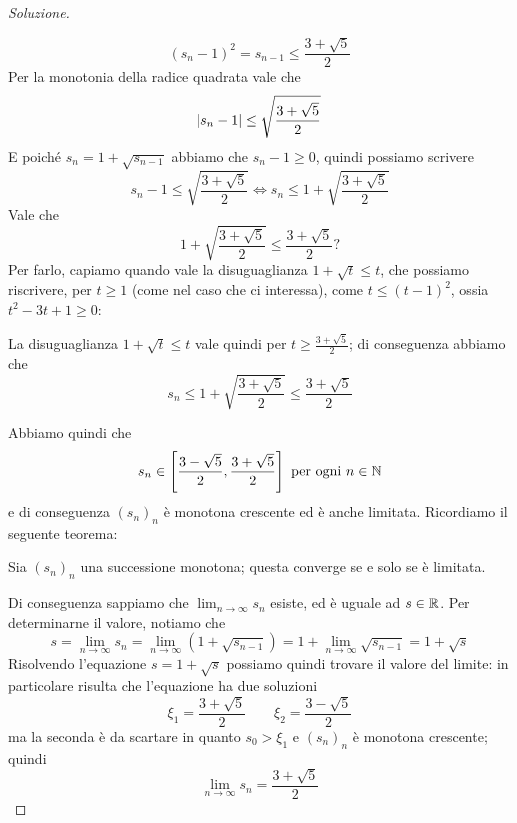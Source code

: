 \begin{proof}[Soluzione]
\begin{enumerate}[(i)]
            \[
            (s_n-1)^2 = s_{n-1} \le \frac{3+\sqrt{5}}{2}
            \]
            Per la monotonia della radice quadrata vale che
            \[
            \abs{s_n-1}\le \sqrt{\frac{3+\sqrt{5}}{2}}
            \]
            E poiché $s_n = 1+\sqrt{s_{n-1}}$ abbiamo che $s_{n}-1\ge 0$, quindi possiamo scrivere
            \[
            s_n-1\le \sqrt{\frac{3+\sqrt{5}}{2}} \iff s_n\le 1+\sqrt{\frac{3+\sqrt{5}}{2}}
            \]
            Vale che
            \[
            1+\sqrt{\frac{3+\sqrt{5}}{2}}\le \frac{3+\sqrt{5}}{2}?
            \]
            Per farlo, capiamo quando vale la disuguaglianza $1+\sqrt{t}\le t$, che possiamo riscrivere, per $t\ge 1$ (come nel caso che ci interessa), come $t\le (t-1)^2$, ossia $t^2-3t+1\ge 0$:
            \begin{center}
        \end{center}
        La disuguaglianza $1+\sqrt{t}\le t$ vale quindi per $t\ge \frac{3+\sqrt{5}}{2}$; di conseguenza abbiamo che
        \[
        s_n \le 1+\sqrt{\frac{3+\sqrt{5}}{2}}\le \frac{3+\sqrt{5}}{2}
        \]
        \end{enumerate}
        Abbiamo quindi che
        \[
        s_n\in \left[\frac{3-\sqrt{5}}{2}, \frac{3+\sqrt{5}}{2}\right]\ \text{per ogni} \ n\in\amsbb{N}
        \]
        e di conseguenza $(s_n)_n$ è monotona crescente ed è anche limitata. Ricordiamo il seguente teorema:
        \begin{tcolorbox}
            \begin{theorem}
                \label{th:4.7}
                Sia $(s_n)_n$ una successione monotona; questa converge se e solo se è limitata.
            \end{theorem}
        \end{tcolorbox}
        Di conseguenza sappiamo che $\lim_{n\to\infty} s_n$ esiste, ed è uguale ad $s\in\amsbb{R}$. Per determinarne il valore, notiamo che
        \[
        s = \lim_{n\to\infty} s_n = \lim_{n\to\infty} \left(1+\sqrt{s_{n-1}}\right) = 1+\lim_{n\to\infty}\sqrt{s_{n-1}} = 1+\sqrt{s}
        \]
        Risolvendo l'equazione $s=1+\sqrt{s}$ possiamo quindi trovare il valore del limite: in particolare risulta che l'equazione ha due soluzioni
        \[
        \xi_1 = \frac{3+ \sqrt{5}}{2} \qquad \xi_2 = \frac{3-\sqrt{5}}{2}
        \]
        ma la seconda è da scartare in quanto $s_0>\xi_1$ e $(s_n)_n$ è monotona crescente; quindi
        \[
        \lim_{n\to\infty} s_n = \frac{3+\sqrt{5}}{2}
        \]
\end{proof}
